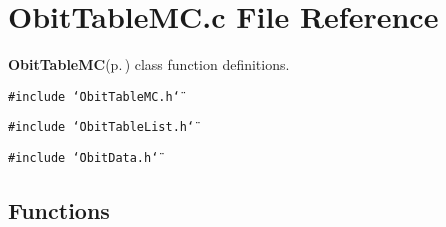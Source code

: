 \section{Obit\-Table\-MC.c File Reference}
\label{ObitTableMC_8c}
{\bf Obit\-Table\-MC}{\rm (p.\,\pageref{structObitTableMC})} class function definitions. 

{\tt \#include \char`\"{}Obit\-Table\-MC.h\char`\"{}}\par
{\tt \#include \char`\"{}Obit\-Table\-List.h\char`\"{}}\par
{\tt \#include \char`\"{}Obit\-Data.h\char`\"{}}\par
\subsection*{Functions}
